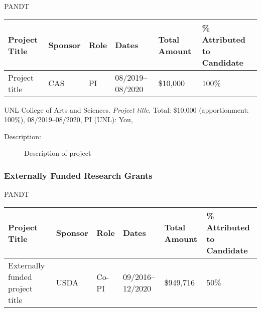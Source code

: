 \begin{taggedblock}{PANDT} %
  \begin{center}
    \footnotesize
    \begin{longtable}{@{}T{6.6cm}T{1.5cm}T{0.8cm}T{2.3cm}T{1.3cm}T{1.9cm}@{}}
      \toprule 
      \textbf{Project Title} & \textbf{Sponsor} & \textbf{Role} & \textbf{Dates}
      & \textbf{Total Amount} & \textbf{\% Attributed to Candidate}\tabularnewline
      \midrule 
      Project title & CAS & PI & 08/2019--08/2020 & \$10,000 &
      100\%\tabularnewline
      \bottomrule
    \end{longtable}\normalsize%
    \end{center}
\end{taggedblock}

\begin{revgrantsenum}[start=2]
\item UNL College of Arts and Sciences. \emph{Project title}. Total: \$10,000
  (apportionment: 100\%), 08/2019–08/2020, PI (UNL): You, 
  \begin{description}
    \item[Description:] Description of project
      \end{description}
\end{revgrantsenum}

\subsubsection{Externally Funded Research Grants}

\begin{taggedblock}{PANDT} %
  \begin{center}
    \footnotesize
    \begin{longtable}{@{}T{6.6cm}T{1.5cm}T{0.8cm}T{2.3cm}T{1.3cm}T{1.9cm}@{}}
      \toprule 
      \textbf{Project Title} & \textbf{Sponsor} & \textbf{Role} & \textbf{Dates}
      & \textbf{Total Amount} & \textbf{\% Attributed to Candidate}\tabularnewline
      \midrule 
      Externally funded project title & USDA & Co-PI & 09/2016--12/2020 & \$949,716 &
      50\%\tabularnewline  
      \bottomrule
    \end{longtable}\normalsize%
    \end{center}
\end{taggedblock}

